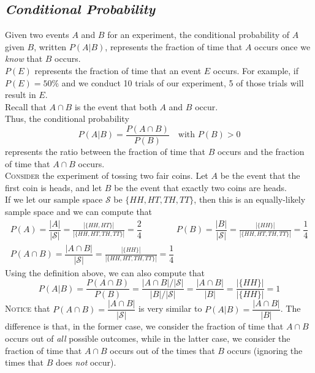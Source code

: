 \documentclass{article}
\begin{document}
\subsection{\em Conditional Probability}
Given two events $A$ and $B$ for an experiment, the {\sc conditional probability} of $A$ given $B$, written $P(A|B)$, represents the fraction of time that $A$ occurs once we \textit{know} that $B$ occurs.\\[1ex]
$P(E)$ represents the fraction of time that an event $E$ occurs. For example, if $P(E)=50\%$ and we conduct 10 trials of our experiment, 5 of those trials will result in $E$.\\
Recall that $A\cap B$ is the event that both $A$ and $B$ occur.\\
Thus, the conditional probability
\begin{equation*}
P(A|B)=\dfrac{P(A\cap B)}{P(B)}\quad\text{with }P(B)>0
\end{equation*}
represents the ratio between the fraction of time that $B$ occurs and the fraction of time that $A\cap B$ occurs.\pagebreak\\
\textsc{Consider} the experiment of tossing two fair coins. Let $A$ be the event that the first coin is heads, and let $B$ be the event that exactly two coins are heads.\\[1ex]
If we let our sample space $\mathcal{S}$ be $\{HH, HT, TH, TT\}$, then this is an equally-likely sample space and we can compute that
\begin{gather*}
P(A)=\dfrac{|A|}{|\mathcal{S}|}=\frac{|\{HH,HT\}|}{|\{HH, HT, TH, TT\}|}=\dfrac{2}{4}\qquad\qquad
P(B)=\dfrac{|B|}{|\mathcal{S}|}=\frac{|\{HH\}|}{|\{HH, HT, TH, TT\}|}=\dfrac{1}{4}\\[1ex]
P(A\cap B)=\dfrac{|A\cap B|}{|\mathcal{S}|}=\frac{|\{HH\}|}{|\{HH, HT, TH, TT\}|}=\dfrac{1}{4}
\end{gather*}
Using the definition above, we can also compute that
\begin{equation*}
P(A|B)=\dfrac{P(A\cap B)}{P(B)}=\dfrac{|A\cap B|/|\mathcal{S}|}{|B|/|\mathcal{S}|}=\dfrac{|A\cap B|}{|B|}=\dfrac{|\{HH\}|}{|\{HH\}|}=1
\end{equation*}
\textsc{Notice} that $P(A\cap B)=\dfrac{|A\cap B|}{|\mathcal{S}|}$ is very similar to $P(A|B)=\dfrac{|A\cap B|}{|B|}$. The difference is that, in the former case, we consider the fraction of time that $A\cap B$ occurs out of \textit{all} possible outcomes, while in the latter case, we consider the fraction of time that $A\cap B$ occurs out of the times that $B$ occurs (ignoring the times that $B$ does \textit{not} occur).\\
\end{document}
